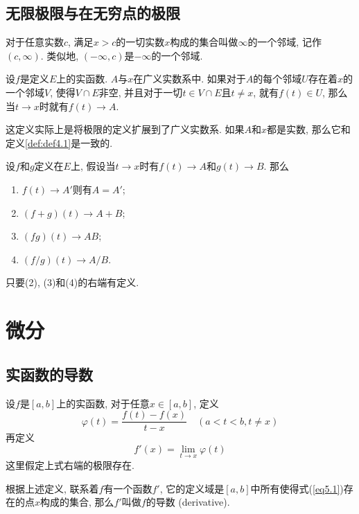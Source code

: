 \documentclass[cn,12pt,math=mtpro2,citestyle=gb7714-2015,bibstyle=gb7714-2015,twocol]{elegantbook}
\begin{document}
\section{无限极限与在无穷点的极限}
\begin{definition}
对于任意实数$c$, 满足$x>c$的一切实数$x$构成的集合叫做$\infty$的一个邻域, 记作$(c,\infty)$. 类似地, $(-\infty,c)$是$-\infty$的一个邻域.
\end{definition}
\begin{definition}
设$f$是定义$E$上的实函数. $A$与$x$在广义实数系中. 如果对于$A$的每个邻域$U$存在着$x$的一个邻域$V$, 使得$V\cap E$非空, 并且对于一切$t\in V\cap E$且$t\neq x$, 就有$f(t)\in U$, 那么当$t\rightarrow x$时就有$f(t)\rightarrow A$.
\end{definition}
这定义实际上是将极限的定义扩展到了广义实数系. 如果$A$和$x$都是实数, 那么它和定义\ref{def:def4.1}是一致的.
\begin{theorem}
  设$f$和$g$定义在$E$上, 假设当$t\rightarrow x$时有$f(t)\rightarrow A$和$g(t)\rightarrow B$. 那么
  \begin{enumerate}[label=(\arabic*)]
  \item $f(t)\rightarrow A'$则有$A=A'$;

  \item $(f+g)(t)\rightarrow A+B$;

  \item $(fg)(t)\rightarrow AB$;

  \item $(f/g)(t)\rightarrow A/B$.
  \end{enumerate}
  只要(2), (3)和(4)的右端有定义.
\end{theorem}
\chapter{微分}
\section{实函数的导数}
\begin{definition}\label{def:def5.2}
设$f$是$[a,b]$上的实函数, 对于任意$x\in[a,b]$, 定义
\begin{equation}\label{eq5.14}
  \varphi(t)=\frac{f(t)-f(x)}{t-x} \quad (a<t<b, t\neq x)
\end{equation}
再定义
\begin{equation}\label{eq5.1}
  f'(x)=\lim_{t\rightarrow x}\varphi(t)
\end{equation}
这里假定上式右端的极限存在.
\end{definition}
根据上述定义, 联系着$f$有一个函数$f'$, 它的定义域是$[a,b]$中所有使得式(\ref{eq5.1})存在的点$x$构成的集合, 那么$f'$叫做$f$的导数 (derivative).
\end{document}

